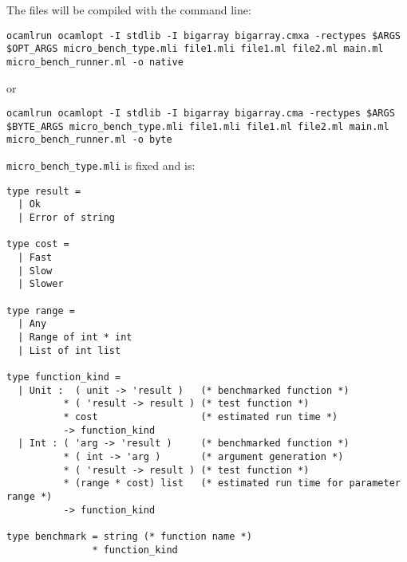 \documentclass[11pt,a4paper]{article}
\begin{document}
The files will be compiled with the command line:
\begin{verbatim}
ocamlrun ocamlopt -I stdlib -I bigarray bigarray.cmxa -rectypes $ARGS $OPT_ARGS micro_bench_type.mli file1.mli file1.ml file2.ml main.ml micro_bench_runner.ml -o native
\end{verbatim}
or
\begin{verbatim}
ocamlrun ocamlopt -I stdlib -I bigarray bigarray.cma -rectypes $ARGS $BYTE_ARGS micro_bench_type.mli file1.mli file1.ml file2.ml main.ml micro_bench_runner.ml -o byte
\end{verbatim}


\label{micro_bench_type.mli}{\tt micro\_bench\_type.mli} is fixed and is:
\begin{verbatim}
type result =
  | Ok
  | Error of string

type cost =
  | Fast
  | Slow
  | Slower

type range =
  | Any
  | Range of int * int
  | List of int list

type function_kind =
  | Unit :  ( unit -> 'result )   (* benchmarked function *)
          * ( 'result -> result ) (* test function *)
          * cost                  (* estimated run time *)
          -> function_kind
  | Int : ( 'arg -> 'result )     (* benchmarked function *)
          * ( int -> 'arg )       (* argument generation *)
          * ( 'result -> result ) (* test function *)
          * (range * cost) list   (* estimated run time for parameter range *)
          -> function_kind

type benchmark = string (* function name *)
               * function_kind
\end{verbatim}
\end{document}
